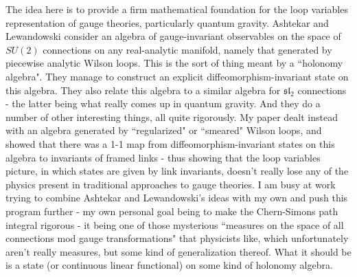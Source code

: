 The idea here is to provide a firm mathematical foundation for the loop variables representation of gauge theories, particularly quantum gravity. Ashtekar and Lewandowski consider an algebra of gauge-invariant observables on the space of $SU(2)$ connections on any real-analytic manifold, namely that generated by piecewise analytic Wilson loops. This is the sort of thing meant by a ``holonomy algebra". They manage to construct an explicit diffeomorphism-invariant state on this algebra. They also relate this algebra to a similar algebra for $\mathfrak{sl}_2$ connections - the latter being what really comes up in quantum gravity. And they do a number of other interesting things, all quite rigorously. My paper dealt instead with an algebra generated by ``regularized" or ``smeared" Wilson loops, and showed that there was a 1-1 map from diffeomorphism-invariant states on this algebra to invariants of framed links - thus showing that the loop variables picture, in which states are given by link invariants, doesn't really lose any of the physics present in traditional approaches to gauge theories. I am busy at work trying to combine Ashtekar and Lewandowski's ideas with my own and push this program further - my own personal goal being to make the Chern-Simons path integral rigorous - it being one of those mysterious ``measures on the space of all connections mod gauge transformations" that physicists like, which unfortunately aren't really measures, but some kind of generalization thereof. What it should be is a state (or continuous linear functional) on some kind of holonomy algebra. 